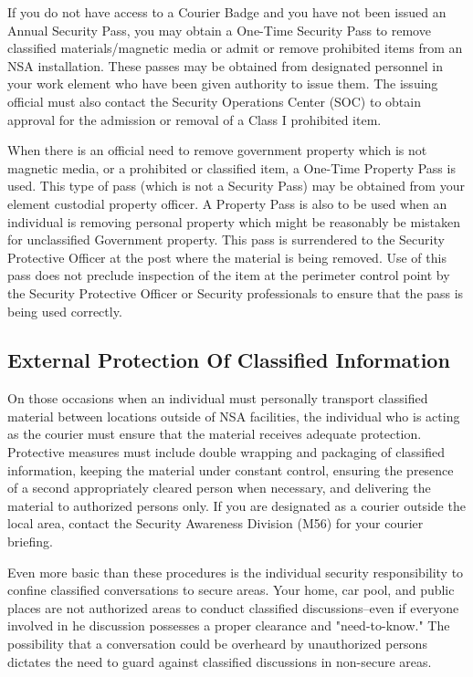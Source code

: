 \documentclass[a4]{article}
\begin{document}
If you do not have access to a Courier Badge and you have not been issued an
Annual Security Pass, you may obtain a One-Time Security Pass to remove
classified materials/magnetic media or admit or remove prohibited items from an
NSA installation.  These passes may be obtained from designated personnel
in your work element who have been given authority to issue them.  The issuing
official must also contact the Security Operations Center (SOC) to obtain
approval for the admission or removal of a Class I prohibited item.

When there is an official need to remove government property which is not
magnetic media, or a prohibited or classified item, a One-Time Property Pass is
used.  This type of pass (which is not a Security Pass) may be obtained from
your element custodial property officer.  A Property Pass is also to be used
when an individual is removing personal property which might be reasonably be
mistaken for unclassified Government property.  This pass is surrendered to the
Security Protective Officer at the post where the material is being removed.
Use of this pass does not preclude inspection of the item at the perimeter
control point by the Security Protective Officer or Security professionals to
ensure that the pass is being used correctly.

\subsection{External Protection Of Classified Information}

On those occasions when an individual must personally transport classified
material between locations outside of NSA facilities, the individual who is
acting as the courier must ensure that the material receives adequate
protection. Protective measures must include double wrapping and packaging of
classified information, keeping the material under constant control, ensuring
the presence of a second appropriately cleared person when necessary, and
delivering the material to authorized persons only.  If you are designated as a
courier outside the local area, contact the Security Awareness Division (M56)
for your courier briefing.

Even more basic than these procedures is the individual security responsibility
to confine classified conversations to secure areas.  Your home, car pool, and
public places are not authorized areas to conduct classified discussions--even
if everyone involved in he discussion possesses a proper clearance and
"need-to-know."  The possibility that a conversation could be overheard by
unauthorized persons dictates the need to guard against classified discussions
in non-secure areas.
\end{document}
